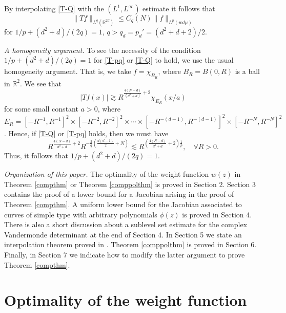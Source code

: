 \documentclass[11 pt]{amsart}
\theoremstyle{plain}
\numberwithin{equation}{section}
\theoremstyle{plain}
\numberwithin{equation}{section}
\theoremstyle{remark}
\begin{document}
By interpolating \eqref{T-Q} with the $(L^1, L^{\infty})$
estimate it follows that
\begin{equation}\label{T-pq}
\| T f\|_{L^q ({{\mathbb {R}}}^{2d})} \le C_{q} (N) \| f\|_{L^p(w d\mu )}
\end{equation}
for $1/p+ (d^2+d)/(2q)=1$, $q> q_d = p_d' = (d^2+d+2)/2$.

\medskip
{\sl A homogeneity argument.}
To see the necessity of the condition $1/p+(d^2 + d)/(2q) = 1$ for \eqref{T-pq}
or \eqref{T-Q} to hold, we use the usual homogeneity argument. That is, we take $f= \chi_{B_R}$, where
$B_R = B(0,R)$ is a ball in ${{\mathbb {R}}}^2$.
We see that
\[ |Tf(x)| {\gtrsim} R^{\frac{4(N-d)}{(d^2+d)}+2} \chi_{E_R} (x/a)
\]
for some small constant $a>0$, where $E_R = [-R^{-1}, R^{-1}]^2
\times [-R^{-2}, R^{-2}]^2 \times \cdots \times [-R^{-(d-1)}, R^{-(d-1)}]^2 \times [-R^{-N}, R^{-N}]^2$.
Hence, if \eqref{T-Q} or \eqref{T-pq} holds, then we must have
\[ R^{\frac{4(N-d)}{d^2+d}+2} R^{-\frac{2}{q}(\frac{d(d-1)}{2} +N)} {\lesssim} R^{(\frac{4(N-d)}{d^2+d}+2) \frac{1}{p} }, \quad \forall R>0 .\]
Thus, it follows that $1/p+(d^2 + d)/(2q) = 1$.

\medskip
{\sl Organization of this paper.} The optimality of the weight function $w(z)$ in Theorem \ref{compthm} or Theorem \ref{comppolthm} is proved in Section 2. Section 3 contains the proof of a lower bound for a Jacobian arising in the proof of Theorem \ref{compthm}. A uniform lower bound for the Jacobian associated to curves of simple type with arbitrary polynomials $\phi(z)$ is proved in Section 4. There is also a short discussion about a sublevel set estimate for the complex Vandermonde determinant at the end of Section 4. In Section 5 we state an interpolation theorem proved in \cite{BOS3}. Theorem \ref{comppolthm} is proved in Section 6.
Finally, in Section 7 we indicate how to modify the latter argument to prove
Theorem \ref{compthm}.

\section{Optimality of the weight function}
\end{document}
